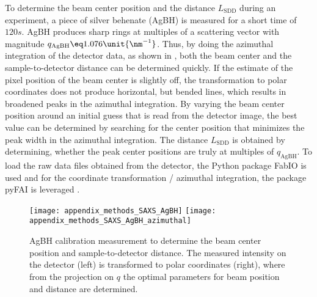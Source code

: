 \documentclass[\main/dresen_thesis.tex]{subfiles}
\begin{document}
    To determine the beam center position and the distance $L_\mathrm{SDD}$ during an experiment, a piece of silver behenate (AgBH) is measured for a short time of $120 \unit{s}$.
    AgBH produces sharp rings at multiples of a scattering vector with magnitude $q_\mathrm{AgBH} \eq 1.076 \unit{\nm^{-1}}$.
    Thus, by doing the azimuthal integration of the detector data, as shown in , both the beam center and the sample-to-detector distance can be determined quickly.
    If the estimate of the pixel position of the beam center is slightly off, the transformation to polar coordinates does not produce horizontal, but bended lines, which results in broadened peaks in the azimuthal integration.
    By varying the beam center position around an initial guess that is read from the detector image, the best value can be determined by searching for the center position that minimizes the peak width in the azimuthal integration.
    The distance $L_\mathrm{SDD}$ is obtained by determining, whether the peak center positions are truly at multiples of $q_\mathrm{AgBH}$.
    To load the raw data files obtained from the detector, the Python package FabIO \cite{Knudsen_2013_Fabio} is used and for the coordinate transformation / azimuthal integration, the package pyFAI is leveraged \cite{Ashiotis_2015_Thefa}.
    \begin{figure}[tb]
      \centering
      \texttt{[image: appendix\_methods\_SAXS\_AgBH]}
      \texttt{[image: appendix\_methods\_SAXS\_AgBH\_azimuthal]}
      \caption{\label{fig:methods:saxs:agBH}AgBH calibration measurement to determine the beam center position and sample-to-detector distance. The measured intensity on the detector (left) is transformed to polar coordinates (right), where from the projection on $q$ the optimal parameters for beam position and distance are determined.}
    \end{figure}
\end{document}
